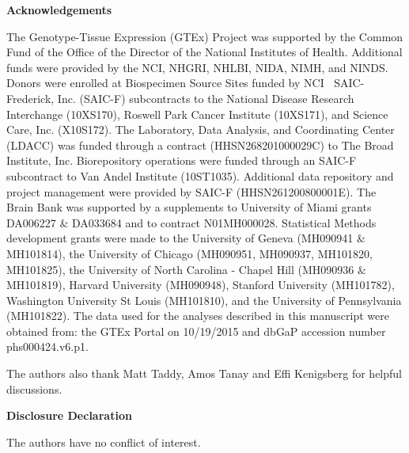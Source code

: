 
\textbf{\large{Acknowledgements}}

\footnotesize{The Genotype-Tissue Expression (GTEx) Project was supported by the Common Fund of the Office of the Director of the National Institutes of Health. Additional funds were provided by the NCI, NHGRI, NHLBI, NIDA, NIMH, and NINDS. Donors were enrolled at Biospecimen Source Sites funded by NCI $\ $ SAIC-Frederick, Inc. (SAIC-F) subcontracts to the National Disease Research Interchange (10XS170), Roswell Park Cancer Institute (10XS171), and Science Care, Inc. (X10S172). The Laboratory, Data Analysis, and Coordinating Center (LDACC) was funded through a contract (HHSN268201000029C) to The Broad Institute, Inc. Biorepository operations were funded through an SAIC-F subcontract to Van Andel Institute (10ST1035). Additional data repository and project management were provided by SAIC-F (HHSN261200800001E). The Brain Bank was supported by a supplements to University of Miami grants DA006227 $\&$ DA033684 and to contract N01MH000028. Statistical Methods development grants were made to the University of Geneva (MH090941 $\&$ MH101814), the University of Chicago (MH090951, MH090937, MH101820, MH101825), the University of North Carolina - Chapel Hill (MH090936 $\&$ MH101819), Harvard University (MH090948), Stanford University (MH101782), Washington University St Louis (MH101810), and the University of Pennsylvania (MH101822). The data used for the analyses described in this manuscript were obtained from: the GTEx Portal on 10/19/2015 and  dbGaP accession number phs000424.v6.p1.

The authors also thank  Matt Taddy, Amos Tanay and Effi Kenigsberg for helpful discussions. }

\textbf{\large{Disclosure Declaration}}

\footnotesize{The authors have no conflict of interest. }















 









